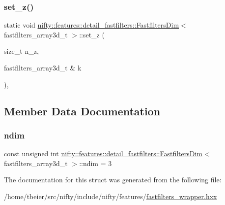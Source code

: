 \subsubsection{\texorpdfstring{set\+\_\+z()}{set\_z()}}
{\footnotesize\ttfamily static void \hyperlink{structnifty_1_1features_1_1detail__fastfilters_1_1FastfiltersDim}{nifty\+::features\+::detail\+\_\+fastfilters\+::\+Fastfilters\+Dim}$<$ fastfilters\+\_\+array3d\+\_\+t $>$\+::set\+\_\+z (\begin{DoxyParamCaption}\item[{size\+\_\+t}]{n\+\_\+z,  }\item[{fastfilters\+\_\+array3d\+\_\+t \&}]{k }\end{DoxyParamCaption})\hspace{0.3cm}{\ttfamily [inline]}, {\ttfamily [static]}}



\subsection{Member Data Documentation}
\mbox{\label{structnifty_1_1features_1_1detail__fastfilters_1_1FastfiltersDim_3_01fastfilters__array3d__t_01_4_ade1a9611314dfe152d2cab3cab55e473}} 
\subsubsection{\texorpdfstring{ndim}{ndim}}
{\footnotesize\ttfamily const unsigned int \hyperlink{structnifty_1_1features_1_1detail__fastfilters_1_1FastfiltersDim}{nifty\+::features\+::detail\+\_\+fastfilters\+::\+Fastfilters\+Dim}$<$ fastfilters\+\_\+array3d\+\_\+t $>$\+::ndim = 3\hspace{0.3cm}{\ttfamily [static]}}



The documentation for this struct was generated from the following file\+:\begin{DoxyCompactItemize}
\item 
/home/tbeier/src/nifty/include/nifty/features/\hyperlink{fastfilters__wrapper_8hxx}{fastfilters\+\_\+wrapper.\+hxx}\end{DoxyCompactItemize}
